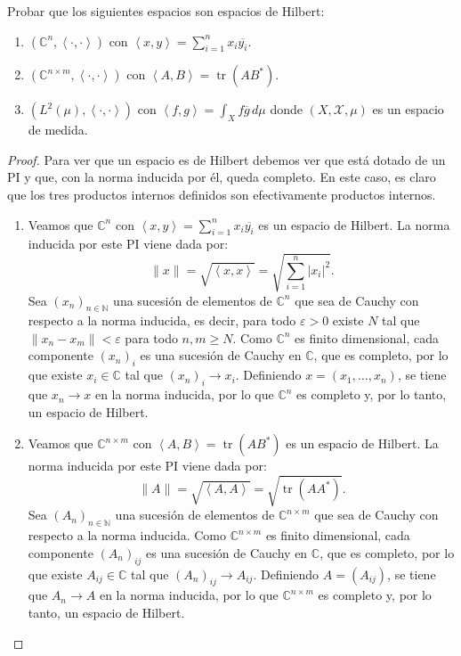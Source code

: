 \documentclass{article}
\theoremstyle{definition}
\newcommand{\N}{\mathbb{N}}
\newcommand{\C}{\mathbb{C}}
\newcommand{\ip}[2]{\left\langle #1, #2 \right\rangle}   %
\newenvironment{ejercicio}[1]{\begin{trivlist}
\item[\hskip \labelsep {\bfseries Ejercicio}\hskip \labelsep {\bfseries #1.}]}{\end{trivlist}}
\begin{document}
\vspace{0.5cm}

\begin{ejercicio}{4}
	Probar que los siguientes espacios son espacios de Hilbert:
	\begin{enumerate}
		\item \( (\C^n, \ip{\cdot}{\cdot}) \) con \( \ip{x}{y} = \sum_{i=1}^{n} x_i \overline{y_i} \).
		\item \( (\C^{n \times m}, \ip{\cdot}{\cdot}) \) con \( \ip{A}{B} = \operatorname{tr}(AB^*) \).
		\item \( (L^2(\mu), \ip{\cdot}{\cdot}) \) con \( \ip{f}{g} = \int_X f \overline{g} \, d\mu \) donde \( (X, \mathcal{X}, \mu) \) es un espacio de medida.
	\end{enumerate}
\end{ejercicio}
\begin{proof}
	Para ver que un espacio es de Hilbert debemos ver que está dotado de un PI y que, con la norma inducida por él, queda completo. En este caso, es claro que los tres productos internos definidos son efectivamente productos internos.
	\begin{enumerate}
		\item Veamos que \( \C^n \) con \( \ip{x}{y} = \sum_{i=1}^{n} x_i \overline{y_i} \) es un espacio de Hilbert. La norma inducida por este PI viene dada por: \[
			      \| x \| = \sqrt{\ip{x}{x}} = \sqrt{\sum_{i=1}^{n} |x_i|^2}.
		      \]
		      Sea \( {(x_n)}_{n \in \N} \) una sucesión de elementos de \( \C^n \) que sea de Cauchy con respecto a la norma inducida, es decir, para todo \( \varepsilon > 0 \) existe \( N \) tal que \( \| x_n - x_m \| < \varepsilon \) para todo \( n, m \ge N \). Como \( \C^n \) es finito dimensional, cada componente \( {(x_n)}_i \) es una sucesión de Cauchy en \( \C \), que es completo, por lo que existe \( x_i \in \C \) tal que \( {(x_n)}_i \to x_i \). Definiendo \( x = (x_1, \dots, x_n) \), se tiene que \( x_n \to x \) en la norma inducida, por lo que \( \C^n \) es completo y, por lo tanto, un espacio de Hilbert.
		\item Veamos que \( \C^{n \times m} \) con \( \ip{A}{B} = \operatorname{tr}(AB^*) \) es un espacio de Hilbert. La norma inducida por este PI viene dada por:
		      \[
			      \| A \| = \sqrt{\ip{A}{A}} = \sqrt{\operatorname{tr}(AA^*)}.
		      \]
		      Sea \( {(A_n)}_{n \in \N} \) una sucesión de elementos de \( \C^{n \times m} \) que sea de Cauchy con respecto a la norma inducida. Como \( \C^{n \times m} \) es finito dimensional, cada componente \( {(A_n)}_{ij} \) es una sucesión de Cauchy en \( \C \), que es completo, por lo que existe \( A_{ij} \in \C \) tal que \( {(A_n)}_{ij} \to A_{ij} \). Definiendo \( A = (A_{ij}) \), se tiene que \( A_n \to A \) en la norma inducida, por lo que \( \C^{n \times m} \) es completo y, por lo tanto, un espacio de Hilbert.

\end{enumerate}
\end{proof}
\end{document}

